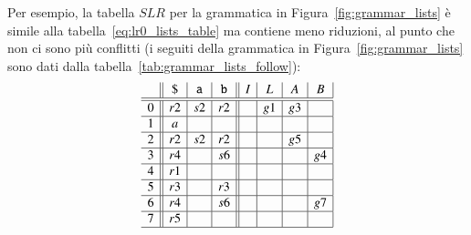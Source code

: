 Per esempio, la tabella $\mathit{SLR}$ per la grammatica in
Figura~\ref{fig:grammar_lists} \`e simile alla
tabella~\eqref{eq:lr0_lists_table} ma contiene meno riduzioni, al punto che
non ci sono pi\`u conflitti (i seguiti della grammatica in
Figura~\ref{fig:grammar_lists} sono dati dalla
tabella~\eqref{tab:grammar_lists_follow}):
%
\begin{equation}\label{tab:slr_grammar_lists}
\begin{array}{c||c|c|c||c|c|c|c|}
  & \mathtt{\$} & \mathtt{a} & \mathtt{b} & I  & L  & A  & B  \\\hline\hline
0 & r2          & s2         & r2         &    & g1 & g3 &    \\\hline
1 & a           &            &            &    &    &    &    \\\hline
2 & r2          & s2         & r2         &    &    & g5 &    \\\hline
3 & r4          &            & s6         &    &    &    & g4 \\\hline
4 & r1          &            &            &    &    &    &    \\\hline
5 & r3          &            & r3         &    &    &    &    \\\hline
6 & r4          &            & s6         &    &    &    & g7 \\\hline
7 & r5          &            &            &    &    &    &    \\\hline
\end{array}
\end{equation}

